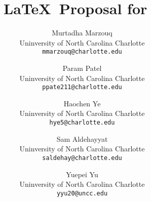 \documentclass[10pt,twocolumn,letterpaper]{article}
\title{\LaTeX\ Proposal for \confName~}
\author{Murtadha Marzouq\\
Uninversity of North Carolina Charlotte\\
{\tt\small mmarzouq@charlotte.edu}
\and
Param Patel\\
Uninversity of North Carolina Charlotte\\
{\tt\small ppate211@charlotte.edu}
\and 
Haochen Ye\\
Uninversity of North Carolina Charlotte\\
{\tt\small hye5@charlotte.edu}
\and
Sam Aldehayyat\\
Uninversity of North Carolina Charlotte\\
{\tt\small saldehay@charlotte.edu}
\and
Yuepei Yu\\
Uninversity of North Carolina Charlotte\\
{\tt\small yyu20@uncc.edu}
}
\begin{document}
\maketitle
    





{
    \small
    
    
}

% 
\end{document}
